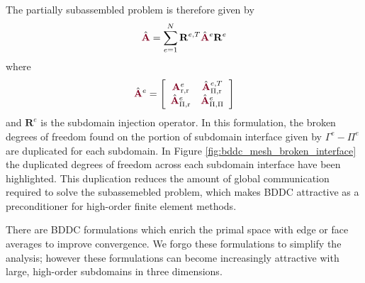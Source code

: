 The partially subassembled problem is therefore given by
\begin{equation}
\hat{\color{burgundy}\mathbf{A}} = \sum_{e = 1}^N \mathbf{R}^{e, T} \hat{\color{burgundy}\mathbf{A}}^e \mathbf{R}^e
\label{eq:subassembled}
\end{equation}
where
\begin{equation}
\hat{\color{burgundy}\mathbf{A}}^e =
\left[ \begin{array}{c c}
{\color{burgundy}\mathbf{A}}_{\text{r}, \text{r}}^e  &  \hat{\color{burgundy}\mathbf{A}}_{\Pi, \text{r}}^{e, T}  \\
\hat{\color{burgundy}\mathbf{A}}_{\Pi, \text{r}}^e   &  \hat{\color{burgundy}\mathbf{A}}_{\Pi, \Pi}^e            \\
\end{array} \right]
\end{equation}
and $\mathbf{R}^e$ is the subdomain injection operator. 
In this formulation, the broken degrees of freedom found on the portion of subdomain interface given by $\Gamma^e - \Pi^e$ are duplicated for each subdomain.
In Figure \ref{fig:bddc_mesh_broken_interface} the duplicated degrees of freedom across each subdomain interface have been highlighted.
This duplication reduces the amount of global communication required to solve the subassemebled problem, which makes BDDC attractive as a preconditioner for high-order finite element methods.

There are BDDC formulations which enrich the primal space with edge or face averages to improve convergence.
We forgo these formulations to simplify the analysis; however these formulations can become increasingly attractive with large, high-order subdomains in three dimensions.

